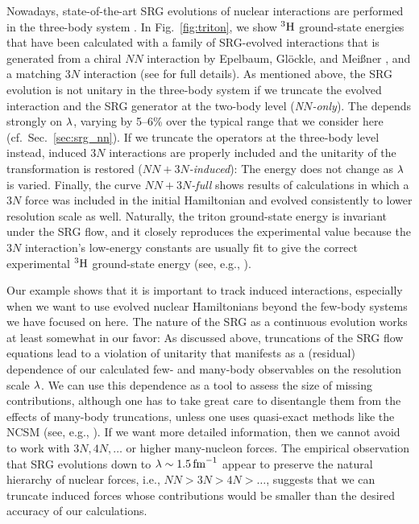 {Nowadays, state-of-the-art SRG evolutions of nuclear interactions are 
performed in the three-body system \cite{Jurgenson:2009bs,Jurgenson:2011zr,Jurgenson:2013fk, 
Hebeler:2012ly,Wendt:2013uq}. In Fig.~\ref{fig:triton}, we show 
$\nuc{H}{3}$ ground-state energies that have been calculated with
a family of SRG-evolved interactions that is generated from a 
chiral \NNLO{} $NN$ interaction by Epelbaum, Gl\"ockle, and Mei\ss{}ner 
\cite{Epelbaum:2002nr,Epelbaum:2006mo},
and a matching $3N$ interaction (see \cite{Hebeler:2012ly} for
full details). As mentioned above, the SRG evolution is not unitary in 
the three-body system if we truncate the evolved interaction and
the SRG generator at the two-body level (\emph{N$N$-only}). The 
depends strongly on $\lambdaSRG$, varying by 5--6\% over the 
typical range that we consider here (cf.~Sec.~\ref{sec:srg_nn}). 
If we truncate the operators at the three-body level instead, induced 
$3N$ interactions are properly included and the unitarity of the 
transformation is restored (\emph{$NN\!+\!3N$-induced}): 
The energy does not change as $\lambdaSRG$ is varied. Finally, the 
curve \emph{$NN\!+\!3N$-full} shows results of calculations in
which a $3N$ force was included in the initial Hamiltonian and
evolved consistently to lower resolution scale as well. Naturally,
the triton ground-state energy is invariant under the SRG flow, and 
it closely reproduces the experimental value because the $3N$ interaction's 
low-energy constants are usually fit to give the correct experimental 
$\nuc{H}{3}$ ground-state energy (see, e.g., 
\cite{Epelbaum:2009ve,Machleidt:2011bh,Gazit:2009qf}).

Our example shows that it is important to track induced interactions,
especially when we want to use evolved nuclear Hamiltonians beyond
the few-body systems we have focused on here. The nature of the SRG 
as a continuous evolution works at least somewhat in our favor: As
discussed above, truncations of the SRG flow equations lead to a 
violation of unitarity that manifests as a (residual) dependence 
of our calculated few- and many-body observables on the resolution 
scale $\lambdaSRG$. We can use this dependence as a tool to assess 
the size of missing contributions, although one has to take great
care to disentangle them from the effects of many-body truncations,
unless one uses quasi-exact methods like the NCSM (see, e.g., 
\cite{Bogner:2010pq,Jurgenson:2009bs,Hebeler:2012ly,Roth:2011kx,Hergert:2013mi,Hergert:2013ij,Binder:2014fk,
Soma:2014eu,Griesshammer:2015dp}). If we want more detailed information,
then we cannot avoid to work with $3N, 4N, \ldots$ or higher many-nucleon 
forces. The empirical observation that SRG evolutions down to $\lambdaSRG\sim1.5\fmi$
appear to preserve the natural hierarchy of nuclear forces, i.e.,  
$NN > 3N > 4N > \ldots$, suggests that we can truncate induced
forces whose contributions would be smaller than the desired accuracy 
of our calculations. 

}
